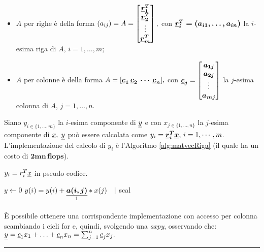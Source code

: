 \begin{itemize}
    \item $A$ per righe è della forma $(a_{ij})=A=
    \begin{bmatrix}
        \boldsymbol{\uline r_1^T}\\
        \boldsymbol{\uline r_2^T}\\
        \vdots\\
        \boldsymbol{\uline r_m^T}\\
    \end{bmatrix},$ con $\boldsymbol{\uline r_i^T=(a_{i1}, \hdots, a_{in})}$ la $i$-esima riga di $A,\, i=1,\hdots, m$;
    \item $A$ per colonne è della forma $A=[\boldsymbol{\uline c_1\, \uline c_2\, \cdots\, \uline c_n}],$ con $\boldsymbol{\uline c_j}=
    \begin{bmatrix}
        \boldsymbol{a_{1j}}\\
        \boldsymbol{a_{2j}}\\
        \vdots\\
        \boldsymbol{a_{mj}}
    \end{bmatrix}$ la $j$-esima colonna di $A$, $j=1,\hdots, n.$
    \end{itemize}

\noindent Siano $y_{i\in\{1,\hdots, m\}}$ la $i$-esima componente di $\uline y$ e con $x_{j\in\{1,\hdots, n\}}$ la $j$-esima componente di $\uline x,\;\uline y$ può essere calcolata come $y_i=\boldsymbol{\uline r_i^T \uline x},\, i=1,\cdots, m$. L'implementazione del calcolo di $y_i$ è l'Algoritmo \ref{alg:matvecRiga} (il quale ha un costo di $\boldsymbol{2mn\, flops}$).

\begin{algorithm}
    \caption{$y_i= r_i^T \uline x$ in pseudo-codice.}
    \label{alg:matvecRiga}
    \begin{algorithmic}
        \State $y\gets 0$
               \State $y(i)=y(i)+\underset{\footnotemark}{\boldsymbol{\uline{a(i,j)}}}*x(j)\quad |$ scal
            \EndFor
        \EndFor
    \end{algorithmic}
\end{algorithm}

È possibile ottenere una corrispondente implementazione con accesso per colonna scambiando i cicli for e, quindi, svolgendo una \textit{axpy}, osservando che: $\uline y= \uline c_1 x_1+ \hdots +\uline c_n x_n=\sum_{j=1}^n\uline c_j x_j.$
\hrule
